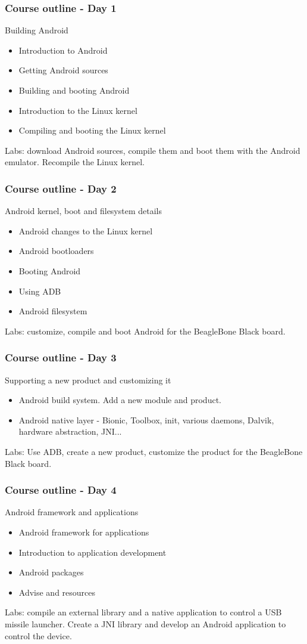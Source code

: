 \begin{frame}
\frametitle{Course outline - Day 1}
Building Android
\begin{itemize}
\item Introduction to Android
\item Getting Android sources
\item Building and booting Android
\item Introduction to the Linux kernel
\item Compiling and booting the Linux kernel
\end{itemize}
Labs: download Android sources, compile them and boot them with the
Android emulator. Recompile the Linux kernel.
\end{frame}

\begin{frame}
\frametitle{Course outline - Day 2}
Android kernel, boot and filesystem details
\begin{itemize}
\item Android changes to the Linux kernel
\item Android bootloaders
\item Booting Android
\item Using ADB
\item Android filesystem
\end{itemize}
Labs: customize, compile and boot Android for the BeagleBone Black board.
\end{frame}

\begin{frame}
\frametitle{Course outline - Day 3}
Supporting a new product and customizing it
\begin{itemize}
\item Android build system. Add a new module and product.
\item Android native layer - Bionic, Toolbox, init, various daemons,
Dalvik, hardware abstraction, JNI...
\end{itemize}
Labs: Use ADB, create a new product, customize the product for the
BeagleBone Black board.
\end{frame}

\begin{frame}
\frametitle{Course outline - Day 4}
Android framework and applications
\begin{itemize}
\item Android framework for applications
\item Introduction to application development
\item Android packages
\item Advise and resources
\end{itemize}
Labs: compile an external library and a native application to control a
USB missile launcher. Create a JNI library and develop an Android
application to control the device.
\end{frame}
